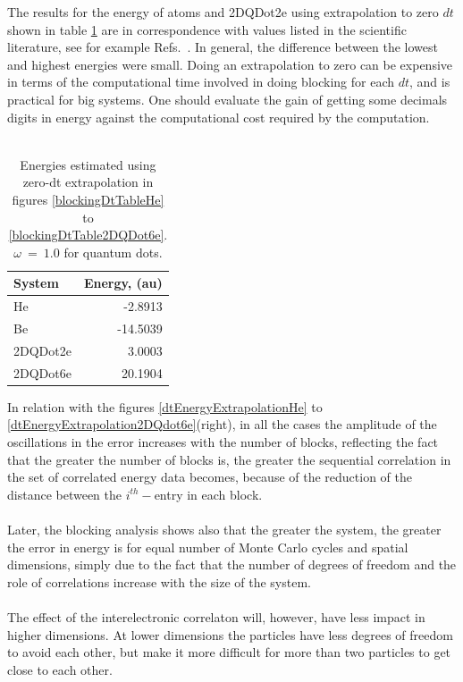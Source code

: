 \noindent
The results for the  energy of atoms and 2DQDot2e using extrapolation to zero $dt$ shown in table \ref{energyCuts} are in correspondence with values listed in the scientific literature, see for example Refs.~\cite{alexander1997, taut1994}. In general, the difference between the lowest and highest energies were small. Doing an extrapolation to zero can be expensive in terms of the computational time involved in doing blocking for each $dt$, and is practical for big systems. One should evaluate the gain of getting some decimals digits in energy against the computational cost required by the computation. \\
\\

\begin{table}
\centering
\begin{tabular}{lr}
\toprule[1pt]
\textbf{System} & \textbf{Energy}, (au)\\
\midrule[1pt]
He &  -2.8913\\
Be &  -14.5039\\
2DQDot2e & 3.0003\\
2DQDot6e & 20.1904\\
\bottomrule[1pt]
\end{tabular}\caption{Energies estimated using zero-dt extrapolation in figures  \ref{blockingDtTableHe} to \ref{blockingDtTable2DQDot6e}. $\omega~=~1.0$ for quantum dots.}\label{energyCuts}
\end{table}

\noindent 
In relation with the figures \ref{dtEnergyExtrapolationHe} to \ref{dtEnergyExtrapolation2DQdot6e}(right), in all the cases the amplitude of the oscillations in the error increases with the number of blocks, reflecting the fact that the greater the number of blocks is, the greater the sequential correlation in the set of correlated energy data becomes, because of the reduction of the distance between the $i^{th}-$entry in each block. \\
\\
\noindent
Later, the blocking analysis shows also that the greater the system, the greater the error in energy is for equal number of Monte Carlo cycles and spatial dimensions, simply due to the fact that the number of degrees of freedom and the role of correlations increase with the size of the system. \\
\\
\noindent
The effect of the interelectronic correlaton will, however, have less impact in higher dimensions. At lower dimensions the particles have less degrees of freedom to avoid each other, but make it more difficult for more than two particles to get close to each other.


